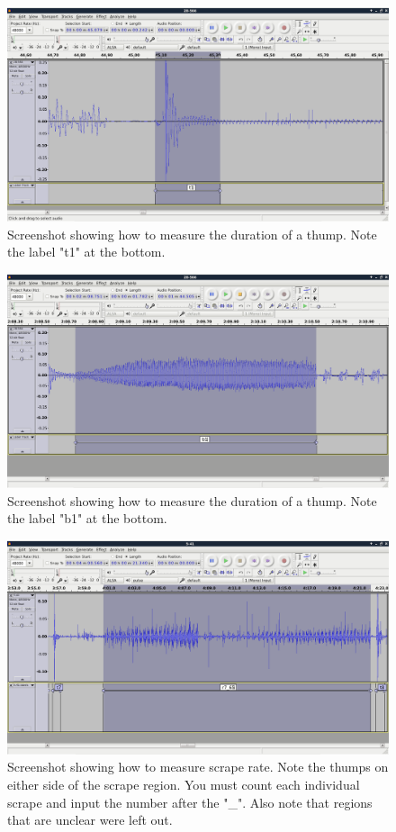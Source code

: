\documentclass[11 pt]{article}
\begin{document}
\begin{figure}[htp]
\centering
\includegraphics[scale=0.30]{thump_duration.png}
\caption{Screenshot showing how to measure the duration of a thump.  Note the label "t1" at the bottom.}
\label{thumpdur}
\end{figure}

\begin{figure}[htp]
\centering
\includegraphics[scale=0.30]{buzz_duration.png}
\caption{Screenshot showing how to measure the duration of a thump.  Note the label "b1" at the bottom.}
\label{buzzdur}
\end{figure}

\begin{figure}[htp]
\centering
\includegraphics[scale=0.30]{scrape_rate.png}
\caption{Screenshot showing how to measure scrape rate.  Note the thumps on either side of the scrape region. You must count each individual scrape and input the number after the "\_". Also note that regions that are unclear were left out.}
\label{srate}
\end{figure}
\end{document}
